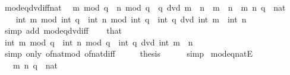 \begin{isabellebody}
\isamarkupfalse%
%
\endisatagproof
{\isafoldproof}%
%
\isadelimproof
\isanewline
%
\endisadelimproof
\isanewline
{}\isamarkupfalse%
\ mod{\isacharunderscore}{\kern0pt}eq{\isacharunderscore}{\kern0pt}dvd{\isacharunderscore}{\kern0pt}iff{\isacharunderscore}{\kern0pt}nat{\isacharcolon}{\kern0pt}\isanewline
\ \ {\isachardoublequoteopen}m\ mod\ q\ {\isacharequal}{\kern0pt}\ n\ mod\ q\ {\isasymlongleftrightarrow}\ q\ dvd\ m\ {\isacharminus}{\kern0pt}\ n{\isachardoublequoteclose}\ \ {\isachardoublequoteopen}m\ {\isasymge}\ n{\isachardoublequoteclose}\ \ m\ n\ q\ {\isacharcolon}{\kern0pt}{\isacharcolon}{\kern0pt}\ nat\isanewline
%
\isadelimproof
%
\endisadelimproof
%
\isatagproof
{}\isamarkupfalse%
\ {\isacharminus}{\kern0pt}\isanewline
\ \ \isamarkupfalse%
\ {\isachardoublequoteopen}int\ m\ mod\ int\ q\ {\isacharequal}{\kern0pt}\ int\ n\ mod\ int\ q\ {\isasymlongleftrightarrow}\ int\ q\ dvd\ int\ m\ {\isacharminus}{\kern0pt}\ int\ n{\isachardoublequoteclose}\isanewline
\ \ \ \ \isamarkupfalse%
\ {\isacharparenleft}{\kern0pt}simp\ add{\isacharcolon}{\kern0pt}\ mod{\isacharunderscore}{\kern0pt}eq{\isacharunderscore}{\kern0pt}dvd{\isacharunderscore}{\kern0pt}iff{\isacharparenright}{\kern0pt}\isanewline
\ \ \isamarkupfalse%
\ that\ \isamarkupfalse%
\ {\isachardoublequoteopen}int\ {\isacharparenleft}{\kern0pt}m\ mod\ q{\isacharparenright}{\kern0pt}\ {\isacharequal}{\kern0pt}\ int\ {\isacharparenleft}{\kern0pt}n\ mod\ q{\isacharparenright}{\kern0pt}\ {\isasymlongleftrightarrow}\ int\ q\ dvd\ int\ {\isacharparenleft}{\kern0pt}m\ {\isacharminus}{\kern0pt}\ n{\isacharparenright}{\kern0pt}{\isachardoublequoteclose}\isanewline
\ \ \ \ \isamarkupfalse%
\ {\isacharparenleft}{\kern0pt}simp\ only{\isacharcolon}{\kern0pt}\ of{\isacharunderscore}{\kern0pt}nat{\isacharunderscore}{\kern0pt}mod\ of{\isacharunderscore}{\kern0pt}nat{\isacharunderscore}{\kern0pt}diff{\isacharparenright}{\kern0pt}\isanewline
\ \ \isamarkupfalse%
\ \isamarkupfalse%
\ {\isacharquery}{\kern0pt}thesis\isanewline
\ \ \ \ \isamarkupfalse%
\ simp\isanewline
{}\isamarkupfalse%
%
\endisatagproof
{\isafoldproof}%
%
\isadelimproof
\isanewline
%
\endisadelimproof
\isanewline
{}\isamarkupfalse%
\ mod{\isacharunderscore}{\kern0pt}eq{\isacharunderscore}{\kern0pt}nat{}E{\isacharcolon}{\kern0pt}\isanewline
\ \ \ m\ n\ q\ {\isacharcolon}{\kern0pt}{\isacharcolon}{\kern0pt}\ nat\isanewline

\end{isabellebody}
